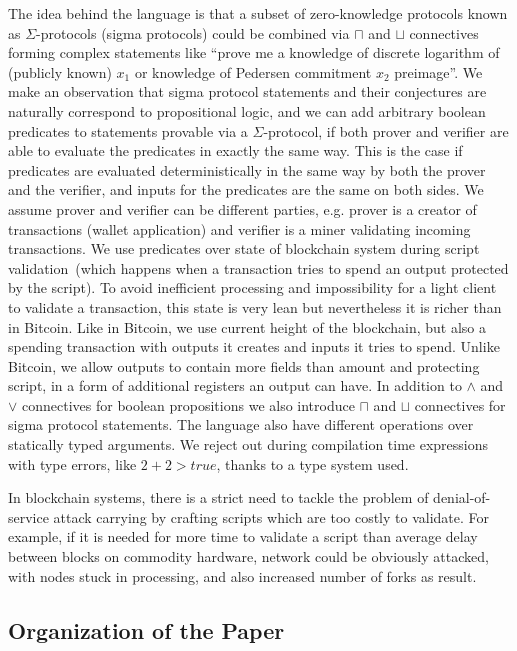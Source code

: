 \documentclass[11pt]{llncs}
\begin{document}
The idea behind the language is that a subset of zero-knowledge protocols known as $\Sigma$-protocols (sigma protocols) could be combined via $\sqcap$ and $\sqcup$ connectives forming complex statements like ``prove me a knowledge of discrete logarithm of (publicly known) $x_1$ or knowledge of Pedersen commitment $x_2$ preimage''. We make an observation that sigma protocol statements and their conjectures are naturally correspond to propositional logic, and we can add arbitrary boolean predicates to statements provable via a $\Sigma$-protocol, if both prover and verifier are able to evaluate the predicates in exactly the same way. This is the case if predicates are evaluated deterministically in the same way by both the prover and the verifier, and inputs for the predicates are the same on both sides.
We assume prover and verifier can be different parties, e.g. prover is a creator of transactions (wallet application) and verifier is a miner validating incoming transactions.
We use predicates over state of blockchain system during script validation~(which happens when a transaction tries to spend an output protected by the script). To avoid inefficient processing and impossibility for a light client to validate a transaction, this state is very lean but nevertheless it is richer than in Bitcoin. Like in Bitcoin, we use current height of the blockchain, but also a spending transaction with outputs it creates and inputs it tries to spend. Unlike Bitcoin, we allow outputs to contain more fields than amount and protecting script, in a form of additional registers an output can have. In addition to $\land$ and $\lor$ connectives for boolean propositions we also introduce $\sqcap$ and $\sqcup$ connectives for sigma protocol statements. The language also have different operations over statically typed arguments. We reject out during compilation time expressions with type errors, like $2 + 2 > true$, thanks to a type system used.

In blockchain systems, there is a strict need to tackle the problem of denial-of-service attack carrying by crafting scripts which are too costly to validate. For example, if it is needed for more time to validate a script than average delay between blocks on commodity hardware, network could be obviously attacked, with nodes stuck in processing, and also increased number of forks as result. 



\subsection{Organization of the Paper}
\end{document}
